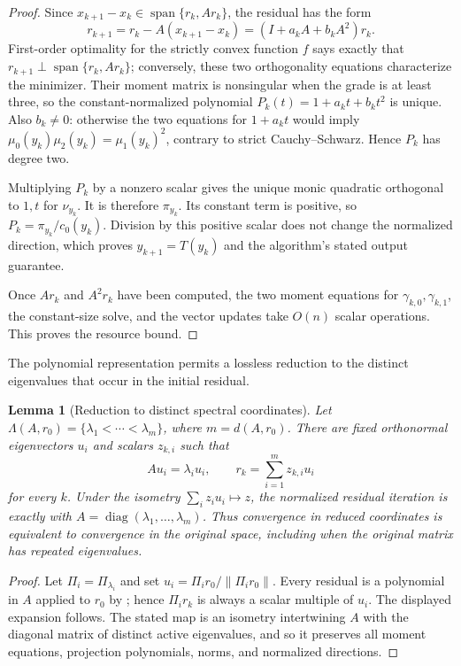 \documentclass[11pt]{article}
\newtheorem{lemma}{Lemma}[section]
\begin{document}
\begin{proof}
Since
\(x_{k+1}-x_k\in\operatorname{span}\{r_k,Ar_k\}\), the residual has the
form
\[
 r_{k+1}=r_k-A(x_{k+1}-x_k)
 =(I+a_kA+b_kA^2)r_k.
\]
First-order optimality for the strictly convex function \(f\) says exactly
that \(r_{k+1}\perp\operatorname{span}\{r_k,Ar_k\}\); conversely, these two
orthogonality equations characterize the minimizer.  Their moment matrix is
nonsingular when the grade is at least three, so the constant-normalized
polynomial \(P_k(t)=1+a_kt+b_kt^2\) is unique.  Also \(b_k\neq0\):
otherwise the two equations for \(1+a_kt\) would imply
\(\mu_0(y_k)\mu_2(y_k)=\mu_1(y_k)^2\), contrary to strict
Cauchy--Schwarz.  Hence \(P_k\) has degree two.

Multiplying \(P_k\) by a nonzero scalar gives the unique monic quadratic
orthogonal to \(1,t\) for \(\nu_{y_k}\).  It is therefore
\(\pi_{y_k}\).  Its constant term is positive, so
\(P_k=\pi_{y_k}/c_0(y_k)\).  Division by this positive scalar does not
change the normalized direction, which proves \(y_{k+1}=T(y_k)\) and the
algorithm's stated output guarantee.

Once \(Ar_k\) and \(A^2r_k\) have been computed, the two moment equations
for \(\gamma_{k,0},\gamma_{k,1}\), the constant-size solve, and the vector
updates take \(O(n)\) scalar operations.  This proves the resource bound.
\end{proof}

The polynomial representation permits a lossless reduction to the distinct
eigenvalues that occur in the initial residual.

\begin{lemma}[Reduction to distinct spectral coordinates]
\label{lem:spectral-reduction}
Let
\(\Lambda(A,r_0)=\{\lambda_1<\cdots<\lambda_m\}\), where
\(m=d(A,r_0)\).  There are
fixed orthonormal eigenvectors \(u_i\) and scalars \(z_{k,i}\) such that
\[
 Au_i=\lambda_i u_i,\qquad
 r_k=\sum_{i=1}^m z_{k,i}u_i
\]
for every \(k\).  Under the isometry
\(\sum_i z_i u_i\mapsto z\), the normalized residual iteration is exactly
 with
\(A=\operatorname{diag}(\lambda_1,\ldots,\lambda_m)\).  Thus convergence
in reduced coordinates is equivalent to convergence in the original space,
including when the original matrix has repeated eigenvalues.
\end{lemma}

\begin{proof}
Let \(\Pi_i=\Pi_{\lambda_i}\) and set
\(u_i=\Pi_ir_0/\lVert\Pi_ir_0\rVert\).  Every residual is a polynomial in
\(A\) applied to \(r_0\) by ; hence
\(\Pi_ir_k\) is always a scalar multiple of \(u_i\).  The displayed
expansion follows.  The stated map is an isometry intertwining \(A\) with
the diagonal matrix of distinct active eigenvalues, and so it preserves all
moment equations, projection polynomials, norms, and normalized directions.
\end{proof}
\end{document}
